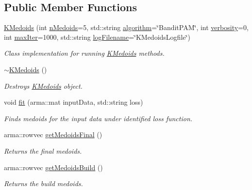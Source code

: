 \subsection*{Public Member Functions}
\begin{DoxyCompactItemize}
\item 
\hyperlink{classKMedoids_aef6c94fdc427f213dfeb719d711db6cf}{K\+Medoids} (int \hyperlink{classKMedoids_a2de8fdd200f9963c3cf9e1f824d1af7b}{n\+Medoids}=5, std\+::string \hyperlink{classKMedoids_a849662ecdbd5164ab37f4bd4f3223344}{algorithm}=\char`\"{}Bandit\+P\+AM\char`\"{}, int \hyperlink{classKMedoids_a8d319c1a783be7c06205bf855b4976b5}{verbosity}=0, int \hyperlink{classKMedoids_a42d3da6b39908d44ed383c6beea55668}{max\+Iter}=1000, std\+::string \hyperlink{classKMedoids_a3cf57e612442072fb377b1714fc5e12e}{log\+Filename}=\char`\"{}K\+Medoids\+Logfile\char`\"{})
\begin{DoxyCompactList}\small\item\em Class implementation for running \hyperlink{classKMedoids}{K\+Medoids} methods. \end{DoxyCompactList}\item 
\hyperlink{classKMedoids_a82710100b6fb5820c10bc3f796ed62ff}{$\sim$\+K\+Medoids} ()
\begin{DoxyCompactList}\small\item\em Destroys \hyperlink{classKMedoids}{K\+Medoids} object. \end{DoxyCompactList}\item 
void \hyperlink{classKMedoids_ae241800e72a6b4a677333ffbf06e1798}{fit} (arma\+::mat input\+Data, std\+::string loss)
\begin{DoxyCompactList}\small\item\em Finds medoids for the input data under identified loss function. \end{DoxyCompactList}\item 
arma\+::rowvec \hyperlink{classKMedoids_a26aa9827d2541626d959dc984f0f9bcb}{get\+Medoids\+Final} ()
\begin{DoxyCompactList}\small\item\em Returns the final medoids. \end{DoxyCompactList}\item 
arma\+::rowvec \hyperlink{classKMedoids_a54370d8d0f5c500f5deb859a9eab891c}{get\+Medoids\+Build} ()
\begin{DoxyCompactList}\small\item\em Returns the build medoids. \end{DoxyCompactList}\item 

\end{DoxyCompactItemize}
